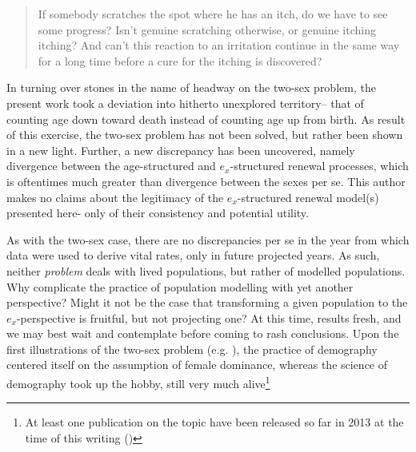\FloatBarrier

\begin{singlespace}
\begin{quote}
 If somebody scratches the spot where he has an itch, do we have to see 
 some progress? Isn't genuine scratching otherwise, or genuine itching 
itching? And can't this reaction to an irritation continue in the 
same way for a long time before a cure for the itching is discovered?
\citep{wittgenstein1984culture}
\end{quote}
\end{singlespace}

In turning over stones in the name of headway on the two-sex problem, the
present work took a deviation into hitherto unexplored territory-- that of
counting age down toward death instead of counting age up from birth. As result of this exercise,
the two-sex problem has not been solved, but rather been shown in a new light.
Further, a new discrepancy has been uncovered, namely divergence between the
age-structured and $e_x$-structured renewal processes, which is oftentimes much greater than
divergence between the sexes per se. This author makes no claims about the
legitimacy of the $e_x$-structured renewal model(s) presented here- only of
their consistency and potential utility. 

As with the two-sex case, there are no
discrepancies per se in the year from which data were used to derive vital
rates, only in future projected years. As such, neither \textit{problem} deals with lived populations, but rather of
modelled populations. Why complicate the practice of population modelling with yet
another perspective? Might it not be the case that transforming a given
population to the $e_x$-perspective is fruitful, but not projecting one? At this
time, results fresh, and we may best wait and contemplate before coming to rash
conclusions. Upon the first illustrations of the two-sex problem (e.g.
\cite{kuczynski1932fertility}), the practice of demography centered itself on
the assumption of female dominance, whereas the science of demography took up
the hobby, still very much alive\footnote{At least one publication on the
topic have been released so far in 2013 at the time of this writing (\citet{Matthews2013})}



